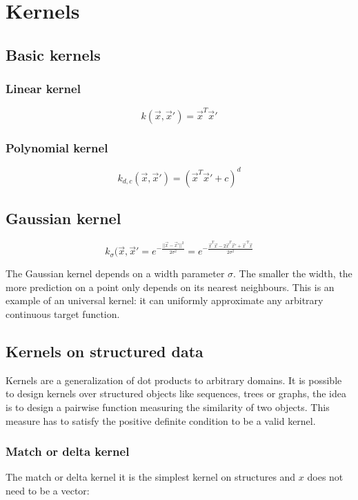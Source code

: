 \section{Kernels}

	\subsection{Basic kernels}

		\subsubsection{Linear kernel}

		$$k(\vec{x},\vec{x}') = \vec{x}^T\vec{x}'$$

		\subsubsection{Polynomial kernel}

		$$k_{d,c}(\vec{x},\vec{x}') = (\vec{x}^T\vec{x}'+c)^d$$

	\subsection{Gaussian kernel}

	$$k_\sigma(\vec{x},\vec{x}' = e^{-\frac{||\vec{x}-\vec{x}'||^2}{2\sigma^2}} = e^{-\frac{\vec{x}^T\vec{x}-2\vec{x}^T\vec{x}' +\vec{x}^{'T}\vec{x}}{2\sigma^2}}$$

	The Gaussian kernel depends on a width parameter $\sigma$.
	The smaller the width, the more prediction on a point only depends on its nearest neighbours.
	This is an example of an universal kernel: it can uniformly approximate any arbitrary continuous target function.

	\subsection{Kernels on structured data}
	Kernels are a generalization of dot products to arbitrary domains.
	It is possible to design kernels over structured objects like sequences, trees or graphs, the idea is to design a pairwise function measuring the similarity of two objects.
	This measure has to satisfy the positive definite condition to be a valid kernel.

		\subsubsection{Match or delta kernel}
		The match or delta kernel it is the simplest kernel on structures and $x$ does not need to be a vector:

